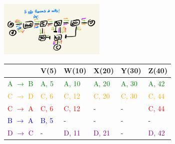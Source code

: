 \begin{enumerate}[leftmargin=\labelsep]
        \begin{figure}[!ht]
          \centering
          \includegraphics[width=0.45\textwidth]{assets/016b.png}
          \qquad
          \centering
          \begin{tabular}{l|l|l|l|l|l}
                                          & V(5)                     & W(10)                     & X(20)                     & Y(30)                     & Z(40)                     \\ \hline
            \textcolor{green}{A $\to$ B}  & \textcolor{green}{A, 5}  & \textcolor{green}{A, 10}  & \textcolor{green}{A, 20}  & \textcolor{green}{A, 30}  & \textcolor{green}{A, 42}  \\
            \textcolor{orange}{C $\to$ D} & \textcolor{orange}{C, 6} & \textcolor{orange}{C, 12} & \textcolor{orange}{C, 20} & \textcolor{orange}{C, 30} & \textcolor{orange}{C, 44} \\
            \textcolor{red}{C $\to$ A}    & \textcolor{red}{C, 6}    & \textcolor{red}{C, 12}    & -                         & -                         & \textcolor{red}{C, 44}    \\
            \textcolor{blue}{B $\to$ A}   & \textcolor{blue}{B, 5}   & -                         & -                         & -                         & -                         \\
            \textcolor{purple}{D $\to$ C} & -                        & \textcolor{purple}{D, 11} & \textcolor{purple}{D, 21} & -                         & \textcolor{purple}{D, 42}
          \end{tabular}
        \end{figure}
\end{enumerate}